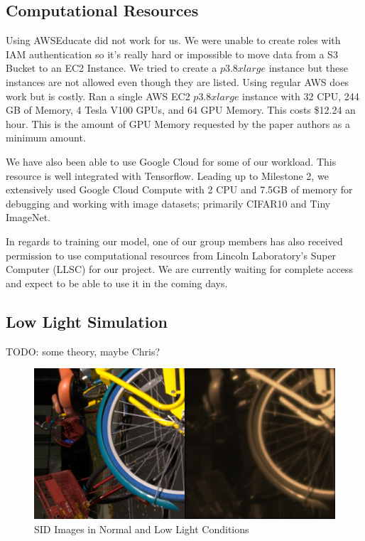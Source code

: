 \documentclass{article}
\begin{document}
\subsection{Computational Resources}

Using AWSEducate did not work for us. We were unable to create roles with
IAM authentication so it's really hard or impossible to move data from a
S3 Bucket to an EC2 Instance. We tried to create a $p3.8xlarge$ instance but
these instances are not allowed even though they are listed. Using regular
AWS does work but is costly. Ran a single AWS EC2 $p3.8xlarge$ instance
with 32 CPU, 244 GB of Memory, 4 Tesla V100 GPUs, and 64 GPU Memory. This
costs \$12.24 an hour. This is the amount of GPU Memory requested by the
paper authors as a minimum amount. \newline

We have also been able to use Google Cloud for some of our workload. This
resource is well integrated with Tensorflow. Leading up to Milestone 2,
we extensively used Google Cloud Compute with 2 CPU and 7.5GB of memory
for debugging and working with image datasets; primarily CIFAR10 and
Tiny ImageNet. \newline

In regards to training our model, one of our group members has also
received permission to use computational resources from Lincoln
Laboratory's Super Computer (LLSC) for our project. We are currently
waiting for complete access and expect to be able to use it in the coming
days.

\subsection{Low Light Simulation}

TODO: some theory, maybe Chris?

\begin{figure}[ht]
  \centering
  \includegraphics[scale=0.1]{00002_00_train_100}
  \caption{ SID Images in Normal and Low Light Conditions}
  \label{fig:train}
\end{figure}
\end{document}
